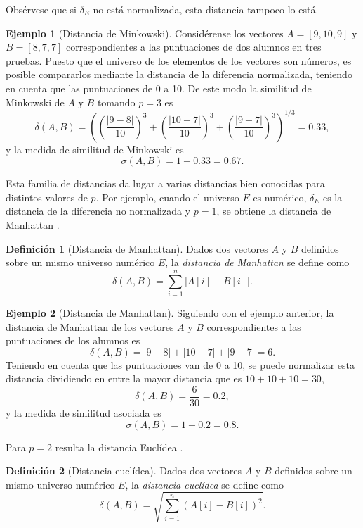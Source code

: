 \documentclass[a4paper,10pt,twoside]{article}
\theoremstyle{definition}
\newtheorem{definition}{Definición}
\newtheorem{example}{Ejemplo}
\begin{document}
Obsérvese que si $\delta_E$ no está normalizada, esta distancia tampoco lo está.  

\begin{example}[Distancia de Minkowski]
Considérense los vectores $A=[9,10,9]$ y $B=[8,7,7]$ correspondientes a las puntuaciones de dos alumnos en tres pruebas.
Puesto que el universo de los elementos de los vectores son números, es posible compararlos mediante la distancia de la diferencia normalizada, teniendo en cuenta que las puntuaciones de 0 a 10.
De este modo la similitud de Minkowski de $A$ y $B$ tomando $p=3$ es
\[
\delta(A,B) =
\left(\left(\frac{|9-8|}{10}\right)^3+\left(\frac{|10-7|}{10}\right)^3+\left(\frac{|9-7|}{10}\right)^3\right)^{1/3} = 0.33,
\]
y la medida de similitud de Minkowski es 
\[
\sigma(A,B) = 1-0.33=0.67.
\]
\end{example}

Esta familia de distancias da lugar a varias distancias bien conocidas para distintos valores de $p$.
Por ejemplo, cuando el universo $E$ es numérico, $\delta_E$ es la distancia de la diferencia no normalizada y $p=1$, se obtiene la distancia de Manhattan \cite{deza2009encyclopedia}.

\begin{definition}[Distancia de Manhattan]
Dados dos vectores $A$ y $B$ definidos sobre un mismo universo numérico $E$, la \emph{distancia de Manhattan} se define como
\[
\delta(A,B)=\sum_{i=1}^{n}|A[i]-B[i]|.
\]
\end{definition}

\begin{example}[Distancia de Manhattan]\label{def:sim-manhattan}
Siguiendo con el ejemplo anterior, la distancia de Manhattan de los vectores $A$ y $B$ correspondientes a las puntuaciones de los alumnos es
\[
\delta(A,B) = |9-8|+|10-7|+|9-7|=6.
\]
Teniendo en cuenta que las puntuaciones van de 0 a 10, se puede normalizar esta distancia dividiendo en entre la mayor distancia que es $10+10+10=30$,
\[
\overline\delta(A,B) = \frac{6}{30}=0.2,
\]
y la medida de similitud asociada es 
\[
\sigma(A,B) = 1-0.2=0.8.
\]
\end{example}

Para $p=2$ resulta la distancia Euclídea \cite{deza2009encyclopedia}.

\begin{definition}[Distancia euclídea]
Dados dos vectores $A$ y $B$ definidos sobre un mismo universo numérico $E$, la \emph{distancia euclídea} se define como
\[
\delta(A,B)=\sqrt{\sum_{i=1}^{n}(A[i]-B[i])^2}.
\]
\end{definition}
\end{document}
